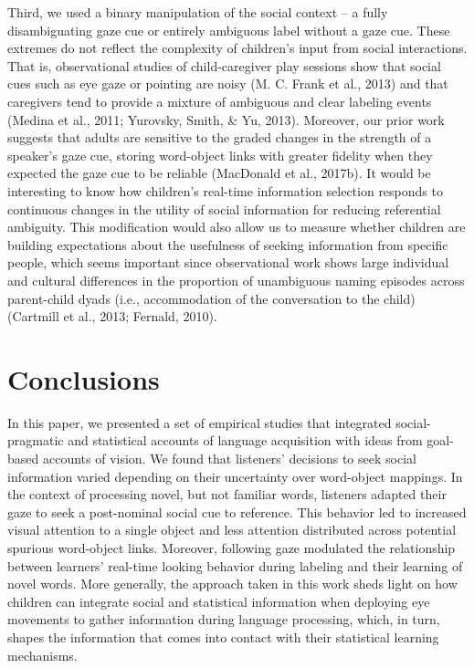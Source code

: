 \documentclass[oneside]{report}
\begin{document}
Third, we used a binary manipulation of the social context -- a fully
disambiguating gaze cue or entirely ambiguous label without a gaze cue.
These extremes do not reflect the complexity of children's input from
social interactions. That is, observational studies of child-caregiver
play sessions show that social cues such as eye gaze or pointing are
noisy (M. C. Frank et al., 2013) and that caregivers tend to provide a
mixture of ambiguous and clear labeling events (Medina et al., 2011;
Yurovsky, Smith, \& Yu, 2013). Moreover, our prior work suggests that
adults are sensitive to the graded changes in the strength of a
speaker's gaze cue, storing word-object links with greater fidelity when
they expected the gaze cue to be reliable (MacDonald et al., 2017b). It
would be interesting to know how children's real-time information
selection responds to continuous changes in the utility of social
information for reducing referential ambiguity. This modification would
also allow us to measure whether children are building expectations
about the usefulness of seeking information from specific people, which
seems important since observational work shows large individual and
cultural differences in the proportion of unambiguous naming episodes
across parent-child dyads (i.e., accommodation of the conversation to
the child) (Cartmill et al., 2013; Fernald, 2010).

\section{Conclusions}\label{conclusions-1}

In this paper, we presented a set of empirical studies that integrated
social-pragmatic and statistical accounts of language acquisition with
ideas from goal-based accounts of vision. We found that listeners'
decisions to seek social information varied depending on their
uncertainty over word-object mappings. In the context of processing
novel, but not familiar words, listeners adapted their gaze to seek a
post-nominal social cue to reference. This behavior led to increased
visual attention to a single object and less attention distributed
across potential spurious word-object links. Moreover, following gaze
modulated the relationship between learners' real-time looking behavior
during labeling and their learning of novel words. More generally, the
approach taken in this work sheds light on how children can integrate
social and statistical information when deploying eye movements to
gather information during language processing, which, in turn, shapes
the information that comes into contact with their statistical learning
mechanisms.
\end{document}
